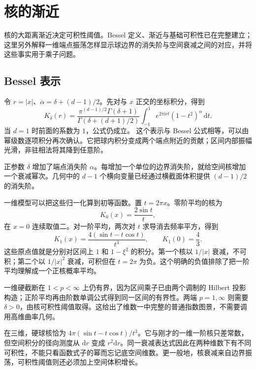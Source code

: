 \section{核的渐近}
\label{b2:sec:2402}

核的大距离渐近决定可积性阈值。Bessel 定义、渐近与基础可积性已在完整建立；这里另外解释一维端点振荡怎样显示球边界的消失阶与空间衰减之间的对应，并将这些事实用于乘子问题。

\subsection{Bessel 表示}
\label{b2:subsec:240201}

令 \(r=|x|\)、\(\alpha=\delta+(d-1)/2\)。先对与 \(x\) 正交的坐标积分，得到
\[
 K_\delta(r)=
 \frac{\pi^{(d-1)/2}\Gamma(\delta+1)}
      {\Gamma(\delta+(d+1)/2)}
 \int_{-1}^1 e^{2\pi\mathrm irt}(1-t^2)^\alpha\,\mathrm dt.
\]
当 \(d=1\) 时前面的系数为 \(1\)，公式仍成立。
这个表示与 Bessel 公式相等，可以由幂级数逐项积分再次确认。它把球内积分变成两个端点附近的贡献；区间内部振幅光滑，非驻相法将其降到任意阶。

\ProseParagraphBreak
正参数 \(\delta\) 增加了端点消失阶 \(\alpha\)。每增加一个单位的边界消失阶，就给空间核增加一个衰减幂次。几何中的 \(d-1\) 个横向变量已经通过横截面体积提供 \((d-1)/2\) 的消失阶。

一维模型可以把这些归一化算到初等函数。置 \(t=2\pi x\)。零阶平均的核为
\[
 K_0(x)=\frac{2\sin t}{t},
\]
在 \(x=0\) 连续取值二。对一阶平均，两次对 \(t\) 求导消去频率平方，得到
\[
 K_1(x)=\frac{4(\sin t-t\cos t)}{t^3},\qquad K_1(0)=\frac43.
\]
这些原点值就是分别对区间上 \(1\) 和 \(1-\xi^2\) 的积分。第一个核以 \(1/|x|\) 衰减，不可积；第二个以 \(1/|x|^2\) 衰减，可积但在 \(t=2\pi\) 为负。这个明确的负值排除了把一阶平均理解成一个正核概率平均。

\ProseParagraphBreak

一维硬截断在 \(1<p<\infty\) 上仍有界，因为区间乘子已由两个调制的 Hilbert 投影构造；正阶平均再由阶数单调公式得到同一区间的有界性。两端 \(p=1,\infty\) 则需要 \(\delta>0\)，由核可积性阈值取得。这给出了维数一中完整的普通指数图景，不需要调用高维曲率几何。

\ProseParagraphBreak

在三维，硬球核恰为
\(4\pi(\sin t-t\cos t)/t^3\)。它与刚才的一维一阶核只差常数，但空间积分的径向测度从 \(\mathrm dr\) 变成 \(r^2\mathrm dr\)。同一衰减表达式因此在两种维数下有不同可积性，不能只看函数式子的幂而忘记底空间维数。更一般地，核衰减来自边界振荡，可积性阈值则还必须加上空间体积增长。

